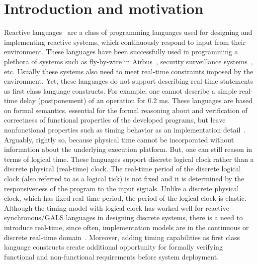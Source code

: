 \section{Introduction and motivation}
\label{sec:intr-motiv}

Reactive languages~\cite{gber931,amal10} are a class of programming
languages used for designing and implementing reactive systems, which
continuously respond to input from their environment. These languages
have been successfully used in programming a plethora of systems such as
fly-by-wire in Airbus~\cite{eairbus}, security surveillance
systems~\cite{amal121}, etc. Usually these systems also need to meet
real-time constraints imposed by the environment. Yet, these languages
do not support describing real-time statements as first class language
constructs.  For example, one cannot describe a simple real-time delay
(postponement) of an operation for 0.2 ms. These languages are based on
formal semantics, essential for the formal reasoning about and
verification of correctness of functional properties of the developed
programs, but leave nonfunctional properties such as timing behavior as
an implementation detail~\cite{boldt07}. Arguably, rightly so, because
physical time cannot be incorporated without information about the
underlying execution platform.  But, one can still reason in terms of
logical time. These languages support discrete logical clock rather than
a discrete physical (real-time) clock. The real-time period of the
discrete logical clock (also referred to as a logical tick) is not fixed
and it is determined by the responsiveness of the program to the input
signals. Unlike a discrete physical clock, which has fixed real-time
period, the period of the logical clock is elastic. Although the timing
model with logical clock has worked well for reactive synchronous/GALS
languages in designing discrete systems, there is a need to introduce
real-time, since often, implementation models are in the continuous or
discrete real-time domain~\cite{DBLP:journals/pieee/SifakisTY03}.
Moreover, adding timing capabilities as first class language constructs
create additional opportunity for formally verifying functional and
non-functional requirements before system deployment.



